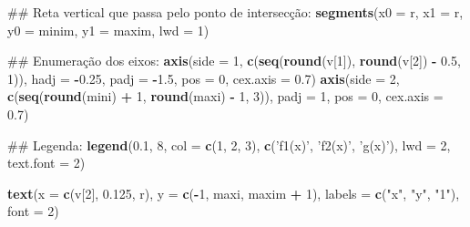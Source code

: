 \documentclass[]{book}
\newenvironment{Shaded}{\begin{snugshade}}{\end{snugshade}}
\newcommand{\KeywordTok}[1]{\textcolor[rgb]{0.13,0.29,0.53}{\textbf{#1}}}
\newcommand{\DataTypeTok}[1]{\textcolor[rgb]{0.13,0.29,0.53}{#1}}
\newcommand{\DecValTok}[1]{\textcolor[rgb]{0.00,0.00,0.81}{#1}}
\newcommand{\FloatTok}[1]{\textcolor[rgb]{0.00,0.00,0.81}{#1}}
\newcommand{\StringTok}[1]{\textcolor[rgb]{0.31,0.60,0.02}{#1}}
\newcommand{\OperatorTok}[1]{\textcolor[rgb]{0.81,0.36,0.00}{\textbf{#1}}}
\newcommand{\NormalTok}[1]{#1}
\begin{document}
\begin{enumerate}
\begin{Shaded}
\begin{Highlighting}[]
\NormalTok{##  Reta vertical que passa pelo ponto de intersecção:}
\KeywordTok{segments}\NormalTok{(}\DataTypeTok{x0 =}\NormalTok{ r, }\DataTypeTok{x1 =}\NormalTok{ r,}
     \DataTypeTok{y0 =}\NormalTok{ minim, }\DataTypeTok{y1 =}\NormalTok{ maxim, }\DataTypeTok{lwd =} \DecValTok{1}\NormalTok{)}

\NormalTok{##  Enumeração dos eixos:}
\KeywordTok{axis}\NormalTok{(}\DataTypeTok{side =} \DecValTok{1}\NormalTok{, }\KeywordTok{c}\NormalTok{(}\KeywordTok{seq}\NormalTok{(}\KeywordTok{round}\NormalTok{(v[}\DecValTok{1}\NormalTok{]), }\KeywordTok{round}\NormalTok{(v[}\DecValTok{2}\NormalTok{]) }\OperatorTok{-}\StringTok{ }\FloatTok{0.5}\NormalTok{, }\DecValTok{1}\NormalTok{)),}
 \DataTypeTok{hadj =} \OperatorTok{-}\FloatTok{0.25}\NormalTok{, }\DataTypeTok{padj =} \OperatorTok{-}\FloatTok{1.5}\NormalTok{, }\DataTypeTok{pos =} \DecValTok{0}\NormalTok{, }\DataTypeTok{cex.axis =} \FloatTok{0.7}\NormalTok{)}
\KeywordTok{axis}\NormalTok{(}\DataTypeTok{side =} \DecValTok{2}\NormalTok{, }\KeywordTok{c}\NormalTok{(}\KeywordTok{seq}\NormalTok{(}\KeywordTok{round}\NormalTok{(mini) }\OperatorTok{+}\StringTok{ }\DecValTok{1}\NormalTok{, }\KeywordTok{round}\NormalTok{(maxi) }\OperatorTok{-}\StringTok{ }\DecValTok{1}\NormalTok{, }\DecValTok{3}\NormalTok{)),}
 \DataTypeTok{padj =} \DecValTok{1}\NormalTok{, }\DataTypeTok{pos =} \DecValTok{0}\NormalTok{, }\DataTypeTok{cex.axis =} \FloatTok{0.7}\NormalTok{)}

\NormalTok{##  Legenda:}
\KeywordTok{legend}\NormalTok{(}\FloatTok{0.1}\NormalTok{, }\DecValTok{8}\NormalTok{, }\DataTypeTok{col =} \KeywordTok{c}\NormalTok{(}\DecValTok{1}\NormalTok{, }\DecValTok{2}\NormalTok{, }\DecValTok{3}\NormalTok{), }\KeywordTok{c}\NormalTok{(}\StringTok{'f1(x)'}\NormalTok{, }\StringTok{'f2(x)'}\NormalTok{, }\StringTok{'g(x)'}\NormalTok{),}
   \DataTypeTok{lwd =} \DecValTok{2}\NormalTok{, }\DataTypeTok{text.font =} \DecValTok{2}\NormalTok{)}

\KeywordTok{text}\NormalTok{(}\DataTypeTok{x =} \KeywordTok{c}\NormalTok{(v[}\DecValTok{2}\NormalTok{], }\FloatTok{0.125}\NormalTok{, r), }\DataTypeTok{y =} \KeywordTok{c}\NormalTok{(}\OperatorTok{-}\DecValTok{1}\NormalTok{, maxi, maxim }\OperatorTok{+}\StringTok{ }\DecValTok{1}\NormalTok{),}
 \DataTypeTok{labels =} \KeywordTok{c}\NormalTok{(}\StringTok{"x"}\NormalTok{, }\StringTok{"y"}\NormalTok{, }\StringTok{"1"}\NormalTok{), }\DataTypeTok{font =} \DecValTok{2}\NormalTok{)}
\end{Highlighting}
\end{Shaded}


\end{enumerate}
\end{document}
